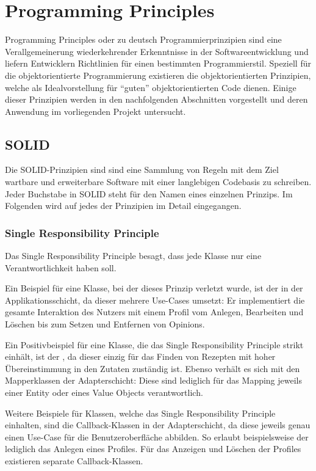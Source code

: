 \chapter{Programming Principles}
Programming Principles oder zu deutsch Programmierprinzipien sind eine Verallgemeinerung wiederkehrender Erkenntnisse in der Softwareentwicklung und liefern Entwicklern Richtlinien für einen bestimmten Programmierstil. Speziell für die objektorientierte Programmierung existieren die objektorientierten Prinzipien, welche als Idealvorstellung für \enquote{guten} objektorientierten Code dienen. Einige dieser Prinzipien werden in den nachfolgenden Abschnitten vorgestellt und deren Anwendung im vorliegenden Projekt untersucht.

\section{SOLID}
Die SOLID-Prinzipien sind sind eine Sammlung von Regeln mit dem Ziel wartbare und erweiterbare Software mit einer langlebigen Codebasis zu schreiben. Jeder Buchstabe in SOLID steht für den Namen eines einzelnen Prinzips. Im Folgenden wird auf jedes der Prinzipien im Detail eingegangen.

\subsection{Single Responsibility Principle}
Das Single Responsibility Principle besagt, dass jede Klasse nur eine Verantwortlichkeit haben soll. 

Ein Beispiel für eine Klasse, bei der dieses Prinzip verletzt wurde, ist der  in der Applikationsschicht, da dieser mehrere Use-Cases umsetzt: Er implementiert die gesamte Interaktion des Nutzers mit einem Profil vom Anlegen, Bearbeiten und Löschen bis zum Setzen und Entfernen von Opinions.

Ein Positivbeispiel für eine Klasse, die das Single Responsibility Principle strikt einhält, ist der , da dieser einzig für das Finden von Rezepten mit hoher Übereinstimmung in den Zutaten zuständig ist. Ebenso verhält es sich mit den Mapperklassen der Adapterschicht: Diese sind lediglich für das Mapping jeweils einer Entity oder eines Value Objects verantwortlich.

Weitere Beispiele für Klassen, welche das Single Responsibility Principle einhalten, sind die Callback-Klassen in der Adapterschicht, da diese jeweils genau einen Use-Case für die Benutzeroberfläche abbilden. So erlaubt beispielsweise der  lediglich das Anlegen eines Profiles. Für das Anzeigen und Löschen der Profiles existieren separate Callback-Klassen.

